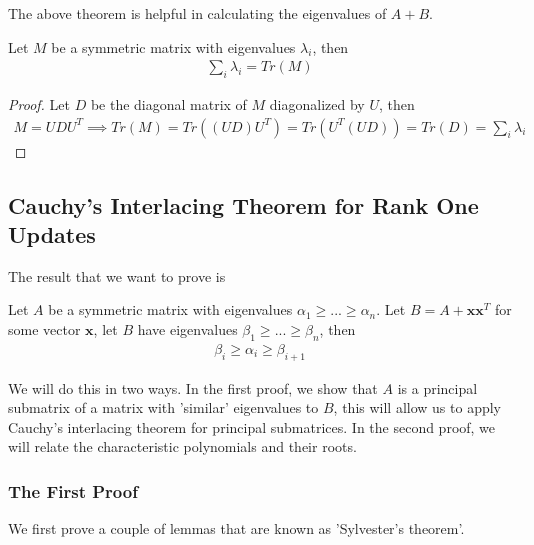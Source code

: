 \documentclass{math}
\renewcommand{\vec}[1]{\boldsymbol{#1}}
\begin{document}
The above theorem is helpful in calculating the eigenvalues of $A + B$.

\begin{theorem}
    Let $M$ be a symmetric matrix with eigenvalues $\lambda_i$, then
    \begin{align*}
        \sum_i \lambda_i = Tr(M)
    \end{align*}
\end{theorem}
\begin{proof}
    Let $D$ be the diagonal matrix of $M$ diagonalized by $U$, then
    \begin{align*}
        M = UDU^T \implies Tr(M) = Tr((UD)U^T) = Tr(U^T (UD)) = Tr(D) = \sum_i \lambda_i
    \end{align*}
\end{proof}

\subsection{Cauchy's Interlacing Theorem for Rank One Updates}

The result that we want to prove is

\begin{theorem}\label{thm:cauchy-rank-one}
    Let $A$ be a symmetric matrix with eigenvalues $\alpha_1 \geq ... \geq \alpha_n$.
    Let $B = A + \vec{x} \vec{x}^T$ for some vector $\vec{x}$, let $B$ have eigenvalues $\beta_1 \geq ... \geq \beta_n$, then
    \begin{align*}
        \beta_i \geq \alpha_i \geq \beta_{i + 1}
    \end{align*}
\end{theorem}

We will do this in two ways. In the first proof, we show that $A$ is a principal submatrix of a matrix with 'similar' eigenvalues to $B$,
this will allow us to apply Cauchy's interlacing theorem for principal submatrices.
In the second proof, we will relate the characteristic polynomials and their roots.

\subsubsection{The First Proof}

We first prove a couple of lemmas that are known as 'Sylvester's theorem'.
\end{document}
